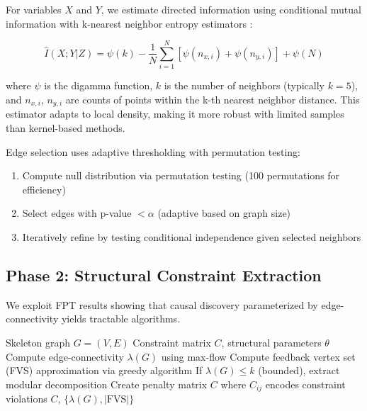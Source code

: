 \documentclass{article}
\begin{document}
For variables $X$ and $Y$, we estimate directed information using conditional mutual information with k-nearest neighbor entropy estimators \citep{kraskov2004estimating}:

\begin{equation}
\hat{I}(X; Y | Z) = \psi(k) - \frac{1}{N} \sum_{i=1}^{N} [\psi(n_{x,i}) + \psi(n_{y,i})] + \psi(N)
\end{equation}

where $\psi$ is the digamma function, $k$ is the number of neighbors (typically $k=5$), and $n_{x,i}$, $n_{y,i}$ are counts of points within the k-th nearest neighbor distance. This estimator adapts to local density, making it more robust with limited samples than kernel-based methods.

Edge selection uses adaptive thresholding with permutation testing:
\begin{enumerate}
    \item Compute null distribution via permutation testing (100 permutations for efficiency)
    \item Select edges with p-value $< \alpha$ (adaptive based on graph size)
    \item Iteratively refine by testing conditional independence given selected neighbors
\end{enumerate}

\subsection{Phase 2: Structural Constraint Extraction}

We exploit FPT results \citep{ganian2024revisiting} showing that causal discovery parameterized by edge-connectivity yields tractable algorithms.

\begin{algorithm}[t]
\caption{Structural Constraint Extraction}
\label{alg:constraints}
\begin{algorithmic}[1]
\Require Skeleton graph $G = (V, E)$
\Ensure Constraint matrix $C$, structural parameters $\theta$
\State Compute edge-connectivity $\lambda(G)$ using max-flow
\State Compute feedback vertex set (FVS) approximation via greedy algorithm
\State If $\lambda(G) \leq k$ (bounded), extract modular decomposition
\State Create penalty matrix $C$ where $C_{ij}$ encodes constraint violations
\State \Return $C$, $\{\lambda(G), |\text{FVS}|\}$
\end{algorithmic}
\end{algorithm}
\end{document}
